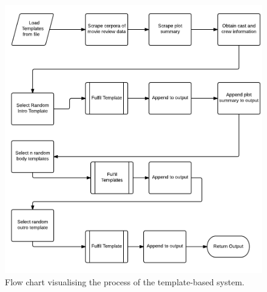 \begin{figure}
\centering
\includegraphics[width=0.7\linewidth]{figures/diagrams_etc/template_system}
\caption{Flow chart visualising the process of the template-based system.}
\label{fig:templatesystem}
\end{figure}


